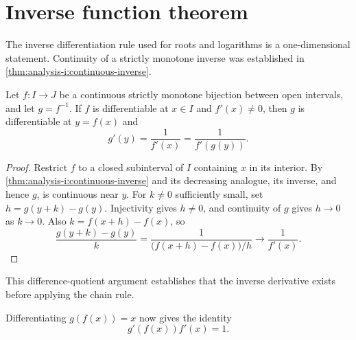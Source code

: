 \section{Inverse function theorem}
\label{sec:analysis-i:inverse-function-theorem}


The inverse differentiation rule used for roots and logarithms is a
one-dimensional statement. Continuity of a strictly monotone inverse was
established in \autoref{thm:analysis-i:continuous-inverse}.
\begin{theorem}
  \label{thm:analysis-i:inverse-derivative}
  Let $f:I\to J$ be a continuous strictly monotone bijection between
  open intervals, and let $g=f^{-1}$. If $f$ is differentiable at
  $x\in I$ and $f'(x)\ne0$, then $g$ is differentiable at $y=f(x)$ and
  \[
    g'(y)=\frac1{f'(x)}=\frac1{f'(g(y))}.
  \]
\end{theorem}
\begin{proof}
  Restrict $f$ to a closed subinterval of $I$ containing $x$ in its
  interior. By \autoref{thm:analysis-i:continuous-inverse} and its
  decreasing analogue, its inverse, and hence $g$, is continuous near $y$.
  For $k\ne0$ sufficiently small, set $h=g(y+k)-g(y)$. Injectivity
  gives $h\ne0$, and continuity of $g$ gives $h\to0$ as $k\to0$.
  Also $k=f(x+h)-f(x)$, so
  \[
    \frac{g(y+k)-g(y)}{k}
      =\frac1{\bigl(f(x+h)-f(x)\bigr)/h}
      \longrightarrow\frac1{f'(x)}.
  \]
\end{proof}
This difference-quotient argument establishes that the inverse derivative
exists before applying the chain rule.

Differentiating $g(f(x))=x$ now gives the identity
\[
  g'(f(x))f'(x)=1.
\]
